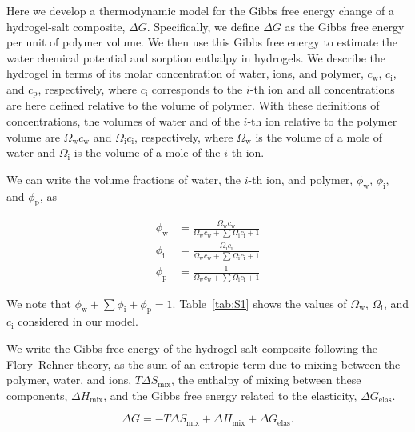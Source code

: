 \documentclass[11pt]{article}
\begin{document}
Here we develop a thermodynamic model for the Gibbs free energy change of a hydrogel-salt composite, $\Delta G$. Specifically, we define $\Delta G$ as the Gibbs free energy per unit of polymer volume. We then use this Gibbs free energy to estimate the water chemical potential and sorption enthalpy in hydrogels. We describe the hydrogel in terms of its molar concentration of water, ions, and polymer, $c_\mathrm{w}$, $c_\mathrm{i}$, and $c_\mathrm{p}$, respectively, where $c_\mathrm{i}$ corresponds to the $i$-th ion and all concentrations are here defined relative to the volume of polymer. With these definitions of concentrations, the volumes of water and of the $i$-th ion relative to the polymer volume are $\Omega_\mathrm{w} c_\mathrm{w}$ and $\Omega_\mathrm{i} c_\mathrm{i}$, respectively, where $\Omega_\mathrm{w}$ is the volume of a mole of water and $\Omega_\mathrm{i}$ is the volume of a mole of the $i$-th ion.

We can write the volume fractions of water, the $i$-th ion, and polymer, $\phi_\mathrm{w}$, $\phi_\mathrm{i}$, and $\phi_\mathrm{p}$, as

\begin{align}
\phi_\mathrm{w} &= \frac{\Omega_\mathrm{w} c_\mathrm{w}}{\Omega_\mathrm{w} c_\mathrm{w} + \sum \Omega_\mathrm{i} c_\mathrm{i} + 1} \tag{S1}\\[4pt]
\phi_\mathrm{i} &= \frac{\Omega_\mathrm{i} c_\mathrm{i}}{\Omega_\mathrm{w} c_\mathrm{w} + \sum \Omega_\mathrm{i} c_\mathrm{i} + 1} \tag{S2}\\[4pt]
\phi_\mathrm{p} &= \frac{1}{\Omega_\mathrm{w} c_\mathrm{w} + \sum \Omega_\mathrm{i} c_\mathrm{i} + 1} \tag{S3}
\end{align}

We note that $\phi_\mathrm{w} + \sum \phi_\mathrm{i} + \phi_\mathrm{p} = 1$. Table~\ref{tab:S1} shows the values of $\Omega_\mathrm{w}$, $\Omega_\mathrm{i}$, and $c_\mathrm{i}$ considered in our model.

We write the Gibbs free energy of the hydrogel-salt composite following the Flory--Rehner theory, as the sum of an entropic term due to mixing between the polymer, water, and ions, $T\Delta S_\mathrm{mix}$, the enthalpy of mixing between these components, $\Delta H_\mathrm{mix}$, and the Gibbs free energy related to the elasticity, $\Delta G_\mathrm{elas}$.\cite{chen2022}

\begin{equation}
\Delta G = -T\Delta S_\mathrm{mix} + \Delta H_\mathrm{mix} + \Delta G_\mathrm{elas}. \tag{S4}
\end{equation}
\end{document}
